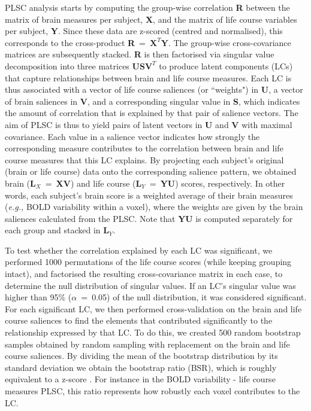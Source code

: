 PLSC analysis starts by computing the group-wise correlation \textbf{R} between the matrix of brain measures per subject, \textbf{X}, and the matrix of life course variables per subject, \textbf{Y}. Since these data are z-scored (centred and normalised), this corresponds to the cross-product \textbf{R}~=~$\textbf{X}^{T}\textbf{Y}$. The group-wise cross-covariance matrices are subsequently stacked. \textbf{R} is then factorised via singular value decomposition into three matrices \textbf{U}\textbf{S}$\textbf{V}^{T}$ to produce latent components (LCs) that capture relationships between brain and life course measures. Each LC is thus associated with a vector of life course saliences (or ``weights") in \textbf{U}, a vector of brain saliences in \textbf{V}, and a corresponding singular value in \textbf{S}, which indicates the amount of correlation that is explained by that pair of salience vectors. The aim of PLSC is thus to yield pairs of latent vectors in \textbf{U} and \textbf{V} with maximal covariance. Each value in a salience vector indicates how strongly the corresponding measure contributes to the correlation between brain and life course measures that this LC explains. By projecting each subject's original (brain or life course) data onto the corresponding salience pattern, we obtained brain ($\textbf{L}_X$~=~\textbf{XV}) and life course ($\textbf{L}_Y$~=~\textbf{YU}) scores, respectively. In other words, each subject's brain score is a weighted average of their brain measures (\textit{e.g.,} BOLD variability within a voxel), where the weights are given by the brain saliences calculated from the PLSC. Note that \textbf{YU} is computed separately for each group and stacked in $\textbf{L}_Y$. 

To test whether the correlation explained by each LC was significant, we performed 1000 permutations of the life course scores (while keeping grouping intact), and factorised the resulting cross-covariance matrix in each case, to determine the null distribution of singular values. If an LC's singular value was higher than 95\% ($\alpha$~=~0.05) of the null distribution, it was considered significant. For each significant LC, we then performed cross-validation on the brain and life course saliences to find the elements that contributed significantly to the relationship expressed by that LC. To do this, we created 500 random bootstrap samples obtained by random sampling with replacement on the brain and life course saliences. By dividing the mean of the bootstrap distribution by its standard deviation we obtain the bootstrap ratio (BSR), which is roughly equivalent to a z-score \citep{McIntosh2004, Krishnan2011}.  For instance in the BOLD variability - life course measures PLSC,  this ratio represents how robustly each voxel contributes to the LC.

